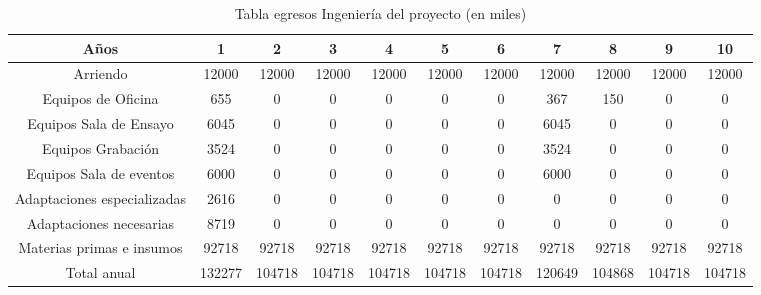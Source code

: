 \begin{table}[htb!]
\centering
\scriptsize
	\begin{tabular}{|c|c|c|c|c|c|c|c|c|c|c|}

		\hline
		Años & 1 & 2 & 3 & 4 & 5 & 6 & 7 & 8 & 9 & 10\\
		\hline
		Arriendo &  12000 &  12000&  12000&  12000&  12000&  12000&  12000&  12000&  12000&  12000 \\
		\hline
		Equipos de Oficina & 655 & 0&0 &0 &0 & 0 & 367 & 150 &0 & 0\\
		\hline
		Equipos Sala de Ensayo & 6045 & 0 & 0 & 0 & 0 & 0 & 6045 & 0 & 0 & 0 \\
		\hline
		Equipos Grabación & 3524 & 0 & 0 & 0 & 0 & 0  & 3524& 0 & 0 & 0 \\
		\hline
		Equipos Sala de eventos & 6000& 0 & 0 & 0 & 0 & 0 &6000 & 0 & 0 &0 \\
		\hline
		Adaptaciones especializadas & 2616 & 0 & 0 & 0 & 0 & 0 & 0 & 0 & 0 & 0 \\
		\hline
		Adaptaciones necesarias & 8719 & 0 & 0 & 0 & 0 & 0 & 0 & 0 & 0 &0  \\
		\hline
		Materias primas e insumos & 92718 & 92718 & 92718 & 92718 & 92718 & 92718 & 92718 & 92718 & 92718 & 92718 \\
		\hline
		Total anual&  132277 &  104718&  104718&  104718&  104718&  104718& 120649 &  104868&  104718&  104718 \\
		\hline
	\end{tabular}
\caption{Tabla egresos Ingeniería del proyecto (en miles)}
\end{table}
